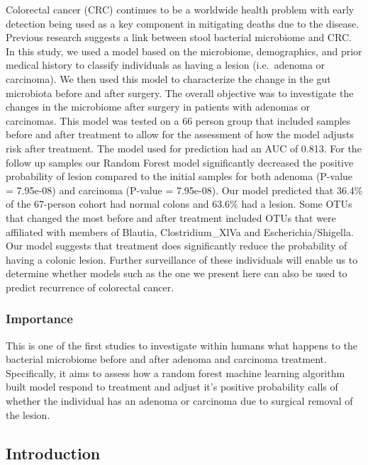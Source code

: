 \documentclass[12pt,]{article}
\begin{document}
Colorectal cancer (CRC) continues to be a worldwide health problem with
early detection being used as a key component in mitigating deaths due
to the disease. Previous research suggests a link between stool
bacterial microbiome and CRC. In this study, we used a model based on
the microbiome, demographics, and prior medical history to classify
individuals as having a lesion (i.e.~adenoma or carcinoma). We then used
this model to characterize the change in the gut microbiota before and
after surgery. The overall objective was to investigate the changes in
the microbiome after surgery in patients with adenomas or carcinomas.
This model was tested on a 66 person group that included samples before
and after treatment to allow for the assessment of how the model adjusts
risk after treatment. The model used for prediction had an AUC of 0.813.
For the follow up samples our Random Forest model significantly
decreased the positive probability of lesion compared to the initial
samples for both adenoma (P-value = 7.95e-08) and carcinoma (P-value =
7.95e-08). Our model predicted that 36.4\% of the 67-person cohort had
normal colons and 63.6\% had a lesion. Some OTUs that changed the most
before and after treatment included OTUs that were affiliated with
members of Blautia, Clostridium\_XlVa and Escherichia/Shigella. Our
model suggests that treatment does significantly reduce the probability
of having a colonic lesion. Further surveillance of these individuals
will enable us to determine whether models such as the one we present
here can also be used to predict recurrence of colorectal cancer.

\newpage

\subsubsection{Importance}\label{importance}

This is one of the first studies to investigate within humans what
happens to the bacterial microbiome before and after adenoma and
carcinoma treatment. Specifically, it aims to assess how a random forest
machine learning algorithm built model respond to treatment and adjust
it's positive probability calls of whether the individual has an adenoma
or carcinoma due to surgical removal of the lesion.

\newpage

\subsection{Introduction}\label{introduction}
\end{document}
